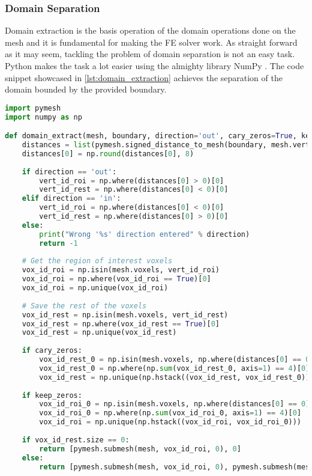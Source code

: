 
\subsubsection{Domain Separation}
Domain extraction is the basis operation of the domain operations done on the mesh and it is fundamental for making the \gls{FE} solver work. As straight forward as it may seem, tackling the problem of domain separation is not an easy task. Python makes the task a lot easier using the almighty library NumPy \cite{Harris2020_numpy}. The code snippet showcased in \autoref{lst:domain_extraction} achieves the separation of the domain bounded by the provided boundary.
\begin{lstlisting}[language=Python,caption={Python code for bounded domain extraction},captionpos=b, label=lst:domain_extraction]
import pymesh
import numpy as np

def domain_extract(mesh, boundary, direction='out', cary_zeros=True, keep_zeros=False):
	distances = list(pymesh.signed_distance_to_mesh(boundary, mesh.vertices))
	distances[0] = np.round(distances[0], 8)
	
	if direction == 'out':
		vert_id_roi = np.where(distances[0] > 0)[0]
		vert_id_rest = np.where(distances[0] < 0)[0]
	elif direction == 'in':
		vert_id_roi = np.where(distances[0] < 0)[0]
		vert_id_rest = np.where(distances[0] > 0)[0]
	else:
		print("Wrong '%s' direction entered" % direction)
		return -1
	
	# Get the region of interest voxels
	vox_id_roi = np.isin(mesh.voxels, vert_id_roi)
	vox_id_roi = np.where(vox_id_roi == True)[0]
	vox_id_roi = np.unique(vox_id_roi)
	
	# Save the rest of the voxels
	vox_id_rest = np.isin(mesh.voxels, vert_id_rest)
	vox_id_rest = np.where(vox_id_rest == True)[0]
	vox_id_rest = np.unique(vox_id_rest)
	
	if cary_zeros:
		vox_id_rest_0 = np.isin(mesh.voxels, np.where(distances[0] == 0)[0])
		vox_id_rest_0 = np.where(np.sum(vox_id_rest_0, axis=1) == 4)[0]
		vox_id_rest = np.unique(np.hstack((vox_id_rest, vox_id_rest_0)))
	
	if keep_zeros:
		vox_id_roi_0 = np.isin(mesh.voxels, np.where(distances[0] == 0)[0])
		vox_id_roi_0 = np.where(np.sum(vox_id_roi_0, axis=1) == 4)[0]
		vox_id_roi = np.unique(np.hstack((vox_id_roi, vox_id_roi_0)))
	
	if vox_id_rest.size == 0:
		return [pymesh.submesh(mesh, vox_id_roi, 0), 0]
	else:
		return [pymesh.submesh(mesh, vox_id_roi, 0), pymesh.submesh(mesh, vox_id_rest, 0)]
\end{lstlisting}


